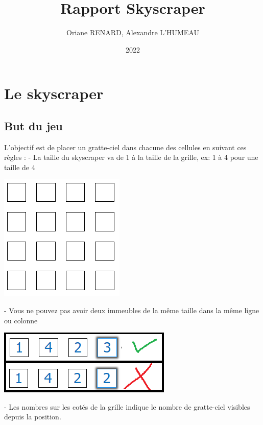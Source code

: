 \documentclass{article}
\title{Rapport Skyscraper}
\author{Oriane RENARD, Alexandre L'HUMEAU}\affil{Département informatique - Paris 8}
\date{2022}
\begin{document}
\maketitle
{}
\vspace*{\fill}
\tableofcontents
\vspace*{\fill}
\newpage
\section{Le skyscraper}
\subsection{But du jeu}
L'objectif est de placer un gratte-ciel dans chacune des cellules en suivant ces règles :
- La taille du skyscraper va de 1 à la taille de la grille, ex: 1 à 4 pour une taille de 4
\begin{center}
	\includegraphics{taille_grille.png}
\end{center}
- Vous ne pouvez pas avoir deux immeubles de la même taille dans la même ligne ou colonne
\begin{center}
	\includegraphics{lignevalide.png}
\end{center}
- Les nombres sur les cotés de la grille indique le nombre de gratte-ciel visibles depuis la position.
\end{document}
